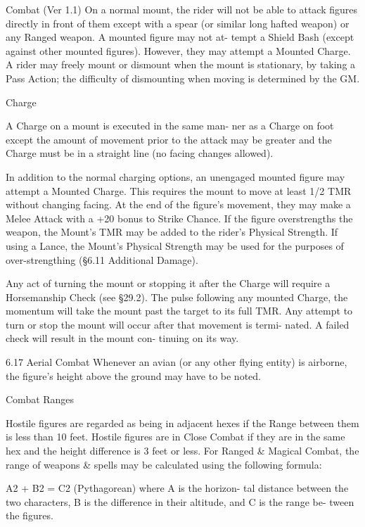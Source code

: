 \begin{Chapter}{Combat (Ver 1.1)}
On  a  normal  mount,  the  rider  will  not  be  able  to 
attack figures directly in front of them except with 
a  spear  (or  similar  long  hafted  weapon)  or  any 
Ranged  weapon.  A  mounted  figure  may  not  at-
tempt a Shield Bash (except against other mounted 
figures).  However,  they  may  attempt  a  Mounted 
Charge.  A  rider  may  freely  mount  or  dismount 
when  the  mount  is  stationary,  by  taking  a  Pass 
Action; the difficulty of dismounting when moving 
is determined by the GM. 

Charge 

A Charge on a mount is executed in the same man-
ner  as  a  Charge  on  foot  except  the  amount  of 
movement  prior  to  the  attack  may  be  greater  and 
the  Charge  must  be  in  a  straight  line  (no  facing 
changes allowed). 

In  addition  to  the  normal  charging  options,  an 
unengaged mounted figure may attempt a Mounted 
Charge.  This  requires  the  mount  to  move  at  least 
1/2  TMR  without  changing  facing.  At  the  end  of 
the  figure’s  movement,  they  may  make  a  Melee 
Attack  with  a  +20  bonus  to  Strike  Chance.  If  the 
figure overstrengths the weapon, the Mount’s TMR 
may  be  added  to  the  rider’s  Physical  Strength.  If 
using a Lance, the Mount’s Physical Strength may 
be used for the purposes of over-strengthing (§6.11 
Additional Damage). 

Any  act  of  turning  the  mount  or  stopping  it  after 
the Charge will require a Horsemanship Check (see 
§29.2).  The  pulse  following  any  mounted  Charge, 
the  momentum will  take  the  mount past  the  target 
to  its  full  TMR.  Any  attempt  to  turn  or  stop  the 
mount  will  occur  after  that  movement  is  termi-
nated. A failed check will result in the mount con-
tinuing on its way. 

6.17 Aerial Combat 
Whenever  an  avian  (or  any  other  flying  entity)  is 
airborne, the figure’s height above the ground may 
have to be noted. 

Combat Ranges 

Hostile  figures  are  regarded  as  being  in  adjacent 
hexes  if  the  Range  between  them  is  less  than  10 
feet. Hostile figures are in Close Combat if they are 
in the same hex and the height difference is 3 feet 
or  less.  For  Ranged  \&  Magical  Combat, the  range 
of  weapons  \&  spells  may  be  calculated  using  the 
following formula: 

A2 + B2 = C2 (Pythagorean) where A is the horizon-
tal  distance  between  the  two  characters,  B  is  the 
difference  in  their  altitude,  and  C  is  the  range  be-
tween the figures. 


\end{Chapter}
